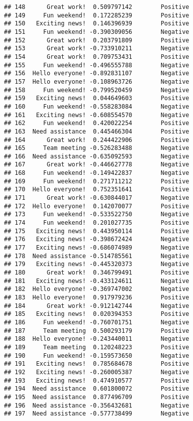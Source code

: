 \documentclass[
]{article}
\begin{document}
\begin{verbatim}
## 148      Great work!  0.509797142        Positive
## 149     Fun weekend!  0.172285239        Positive
## 150   Exciting news!  0.146396939        Positive
## 151     Fun weekend! -0.390309056        Negative
## 152      Great work!  0.203791809        Positive
## 153      Great work! -0.733910211        Negative
## 154      Great work!  0.709753431        Positive
## 155     Fun weekend! -0.496555788        Negative
## 156  Hello everyone! -0.892831107        Negative
## 157  Hello everyone! -0.108963726        Negative
## 158     Fun weekend! -0.799520459        Negative
## 159   Exciting news!  0.044649603        Positive
## 160     Fun weekend! -0.558283084        Negative
## 161   Exciting news! -0.608554570        Negative
## 162     Fun weekend!  0.420022254        Positive
## 163  Need assistance  0.445466304        Positive
## 164      Great work!  0.244422906        Positive
## 165     Team meeting -0.526283488        Negative
## 166  Need assistance -0.635092593        Negative
## 167      Great work! -0.446627778        Negative
## 168     Fun weekend! -0.149422837        Negative
## 169     Fun weekend!  0.271711212        Positive
## 170  Hello everyone!  0.752351641        Positive
## 171      Great work! -0.630844017        Negative
## 172  Hello everyone!  0.142070077        Positive
## 173     Fun weekend! -0.533522750        Negative
## 174     Fun weekend!  0.201027735        Positive
## 175   Exciting news!  0.443950114        Positive
## 176   Exciting news! -0.398672424        Negative
## 177   Exciting news! -0.686074989        Negative
## 178  Need assistance -0.514785561        Negative
## 179   Exciting news! -0.445320373        Negative
## 180      Great work!  0.346799491        Positive
## 181   Exciting news! -0.433124611        Negative
## 182  Hello everyone! -0.369747002        Negative
## 183  Hello everyone!  0.917979236        Positive
## 184      Great work! -0.912142744        Negative
## 185   Exciting news!  0.020394353        Positive
## 186     Fun weekend! -0.760701751        Negative
## 187     Team meeting  0.500293179        Positive
## 188  Hello everyone! -0.243440011        Negative
## 189     Team meeting  0.120248223        Positive
## 190     Fun weekend! -0.159573650        Negative
## 191   Exciting news!  0.785684678        Positive
## 192   Exciting news! -0.260005387        Negative
## 193   Exciting news!  0.474910577        Positive
## 194  Need assistance  0.601800072        Positive
## 195  Need assistance  0.877496709        Positive
## 196  Need assistance -0.356432681        Negative
## 197  Need assistance -0.577738499        Negative

\end{verbatim}
\end{document}
